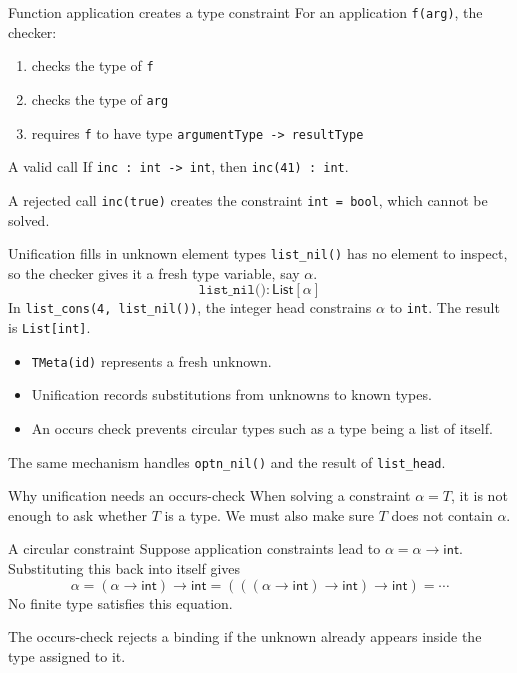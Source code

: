 \documentclass[aspectratio=169,11pt]{beamer}
\newcommand{\Int}{\mathsf{int}}
\begin{document}
\begin{frame}{Function application creates a type constraint}
For an application \texttt{f(arg)}, the checker:
\begin{enumerate}
  \item checks the type of \texttt{f}
  \item checks the type of \texttt{arg}
  \item requires \texttt{f} to have type \texttt{argumentType -> resultType}
\end{enumerate}
\begin{exampleblock}{A valid call}
If \texttt{inc : int -> int}, then \texttt{inc(41) : int}.
\end{exampleblock}
\begin{alertblock}{A rejected call}
\texttt{inc(true)} creates the constraint \texttt{int = bool}, which cannot be solved.
\end{alertblock}
\end{frame}

\begin{frame}{Unification fills in unknown element types}
\texttt{list\_nil()} has no element to inspect, so the checker gives it a fresh type variable, say $\alpha$.
\[
\texttt{list\_nil()} : \mathsf{List}[\alpha]
\]
In \texttt{list\_cons(4, list\_nil())}, the integer head constrains $\alpha$ to \texttt{int}. The result is \texttt{List[int]}.
\begin{itemize}
  \item \texttt{TMeta(id)} represents a fresh unknown.
  \item Unification records substitutions from unknowns to known types.
  \item An occurs check prevents circular types such as a type being a list of itself.
\end{itemize}
The same mechanism handles \texttt{optn\_nil()} and the result of \texttt{list\_head}.
\end{frame}

\begin{frame}{Why unification needs an occurs-check}
When solving a constraint $\alpha = T$, it is not enough to ask whether $T$ is a type. We must also make sure $T$ does not contain $\alpha$.
\begin{exampleblock}{A circular constraint}
Suppose application constraints lead to $\alpha = \alpha\to\Int$. Substituting this back into itself gives
\[
\alpha = (\alpha\to\Int)\to\Int = (((\alpha\to\Int)\to\Int)\to\Int) = \cdots
\]
No finite type satisfies this equation.
\end{exampleblock}
The occurs-check rejects a binding if the unknown already appears inside the type assigned to it.
\end{frame}
\end{document}
